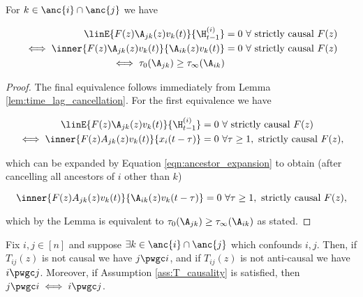 \begin{corollary}
  \label{cor:time_lag_cancellation}
  For $k \in \anc{i} \cap \anc{j}$ we have

  \begin{align*}
    \linE{F(z)\A_{jk}(z)v_k(t)}{\H_{t - 1}^{(i)}} &= 0\ \forall \text{ strictly causal } F(z)\\
    \iff \inner{F(z)\A_{jk}(z)v_k(t)}{\A_{ik}(z)v_k(t)} &= 0\ \forall \text{ strictly causal } F(z)\\
    \iff \tau_0(\A_{jk}) \ge \tau_\infty(\A_{ik})
  \end{align*}
\end{corollary}
\begin{proof}
  The final equivalence follows immediately from Lemma \ref{lem:time_lag_cancellation}.  For the first equivalence we have

  \begin{align*}
    \linE{F(z)\A_{jk}(z)v_k(t)}{\H_{t - 1}^{(i)}} &= 0\ \forall \text{ strictly causal } F(z)\\
    \iff \inner{F(z)A_{jk}(z)v_k(t)}{x_i(t - \tau)} &= 0\ \forall \tau \ge 1, \text{ strictly causal } F(z),
  \end{align*}

  which can be expanded by Equation \eqref{eqn:ancestor_expansion} to
  obtain (after cancelling all ancestors of $i$ other than $k$)

  \begin{equation*}
    \inner{F(z)A_{jk}(z)v_k(t)}{\A_{ik}(z)v_k(t - \tau)} = 0\ \forall \tau \ge 1, \text{ strictly causal } F(z),
  \end{equation*}

  which by the Lemma is equivalent to $\tau_0(\A_{jk}) \ge \tau_\infty(\A_{ik})$ as stated.
\end{proof}

\begin{proposition}
  \label{prop:persistence_converse}
  Fix $i, j \in [n]$ and suppose $\exists k \in \anc{i} \cap \anc{j}$
  which confounds $i, j$.  Then, if $T_{ij}(z)$ is not causal we have
  $j \pwgc i$, and if $T_{ij}(z)$ is not anti-causal we have
  $i \pwgc j$.  Moreover, if Assumption \ref{ass:T_causality} is
  satisfied, then $j \pwgc i \iff i \pwgc j$.
\end{proposition}

